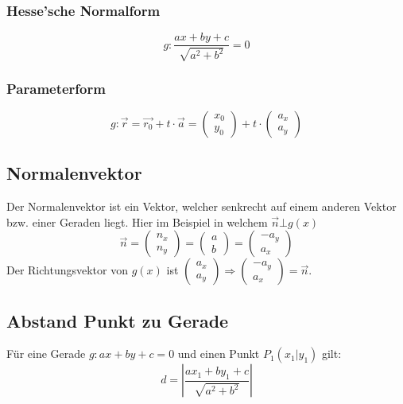 \subsubsection{Hesse'sche Normalform}
\[ \boxed{ g:  \frac{ax + by + c}{\sqrt{ a^2 + b^2 } } = 0 }  \]

\subsubsection{Parameterform}
\[ \boxed{ 
	g: \vec{r} = \vec{r_0} + t \cdot \vec{a}  = 
    \left( 
		\begin{array}{cc} 
	  		x_0 \\ y_0
		\end{array}
	\right)
    + t \cdot 
    \left( 
		\begin{array}{cc} 
			a_x \\ a_y
		\end{array}
    \right)  
   }
\]


\subsection{Normalenvektor}
Der Normalenvektor ist ein Vektor, welcher senkrecht auf einem anderen Vektor 
bzw. einer Geraden liegt. Hier im Beispiel in welchem $ \vec{n} \bot g(x)$
\[ \boxed{ \vec{n} = 
	\left( 
		\begin{array}{cc} 
	  		n_x \\ n_y
		\end{array}
    \right)
    =
    \left( 
		\begin{array}{cc} 
			a \\ b
		\end{array}
    \right)
    =
    \left( 
		\begin{array}{cc} 
			-a_y \\ a_x
		\end{array}
    \right)
} \]
\noindent
Der Richtungsvektor von $g(x)$ ist 
$  
	\left( 
		\begin{array}{cc} 
	  		a_x \\ a_y
		\end{array}
    \right)
    \Rightarrow 
    \left( 
		\begin{array}{cc} 
	  		-a_y \\ a_x
		\end{array}
    \right)
    = \vec{n}
$.

\subsection{Abstand Punkt zu Gerade}
Für eine Gerade $g: ax + by + c = 0$ und einen Punkt $P_1 (x_1 | y_1)$ gilt:
\[ \boxed{ d = \left| \frac{ax_1 + by_1 + c}{\sqrt{a^2 + b^2}} \right| } \]

